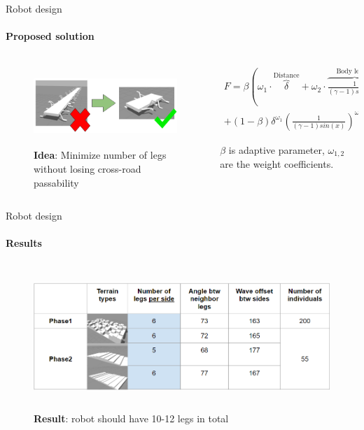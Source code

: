\documentclass[aspectratio=169]{beamer}
\begin{document}
\begin{frame}[t]{Robot design}
    \framesubtitle{Proposed solution}
    \begin{columns}[T,onlytextwidth]
        \begin{column}{0.49\textwidth}
            \begin{figure}[H]
                \centering\includegraphics[height=3cm,width=1\textwidth,keepaspectratio]{optimization_idea.png}
                \caption*{\textbf{Idea}: Minimize number of legs without losing cross-road passability}
                \label{fig{optimization_idea.png}}
            \end{figure}
        \end{column}
        \begin{column}{0.49\textwidth}
            \begin{eqnarray*}
                F = \beta \left( {\omega}_{1} \cdot \overbrace{\delta}^{\text{Distance}} + {\omega}_{2} \cdot \overbrace{\frac{1}{(\gamma - 1) sin(x)}}^{\text{Body length}}\right) +\\ \nonumber + (1 - \beta) {\delta}^{{\omega}_{1}} {\left( \frac{1}{(\gamma - 1) sin(x)}\right)}^{{\omega}_{2}}
            \end{eqnarray*}
            \vspace{1pt}

            $\beta$ is adaptive parameter, ${\omega}_{1,2}$ are the weight coefficients.
        \end{column}
    \end{columns}
\end{frame}

\begin{frame}[t]{Robot design}
    \framesubtitle{Results}
    \vspace{-0.5cm}
    \begin{figure}[H]
        \centering\includegraphics[height=5.5cm,width=1\textwidth,keepaspectratio]{table_terrain.png}
        \caption*{\textbf{Result}: robot should have 10-12 legs in total}
        \label{fig:table_terrain.png}
    \end{figure}
\end{frame}
\end{document}
